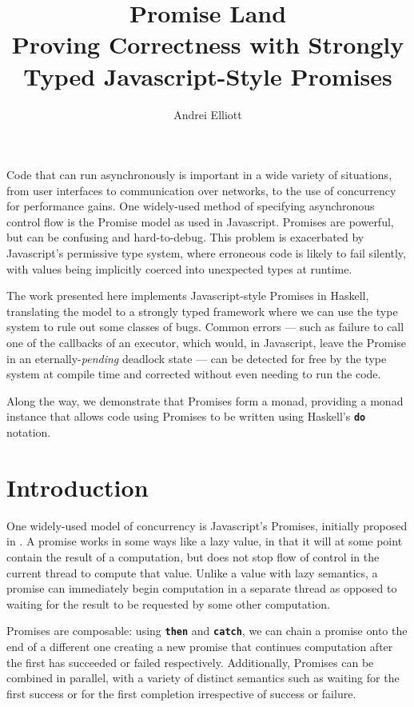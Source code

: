 \documentclass[12pt, english, letterpaper]{kuthesis}
\title{Promise Land\\
\smaller Proving Correctness with Strongly Typed Javascript-Style Promises}
\author{Andrei Elliott}
\newcommand{\lit}[1]{\textbf{\texttt{#1}}}
\begin{document}
\begin{romanpages}
  \maketitle
  \begin{abstractlong}
    Code that can run asynchronously is important in a wide variety of situations, from user interfaces to communication over networks, to the use of concurrency for performance gains.  One widely-used method of specifying asynchronous control flow is the \textsf{Promise} model as used in Javascript.  \textsf{Promises} are powerful, but can be confusing and hard-to-debug.  This problem is exacerbated by Javascript’s permissive type system, where erroneous code is likely to fail silently, with values being implicitly coerced into unexpected types at runtime.

The work presented here implements Javascript-style \textsf{Promises} in Haskell, translating the model to a strongly typed framework where we can use the type system to rule out some classes of bugs.  Common errors --- such as failure to call one of the callbacks of an executor, which would, in Javascript, leave the \textsf{Promise} in an eternally-\emph{pending} deadlock state --- can be detected for free by the type system at compile time and corrected without even needing to run the code.

Along the way, we demonstrate that \textsf{Promises} form a monad, providing a monad instance that allows code using \textsf{Promises} to be written using Haskell’s \lit{do} notation.
  \end{abstractlong}
\end{romanpages}

\chapter*{Introduction}
One widely-used model of concurrency is Javascript's \textsf{Promises}, initially proposed in \cite{friedman}.  A promise works in some ways like a lazy value, in that it will at some point contain the result of a computation, but does not stop flow of control in the current thread to compute that value.  Unlike a value with lazy semantics, a promise can immediately begin computation in a separate thread as opposed to waiting for the result to be requested by some other computation.

\textsf{Promises} are composable: using \lit{then} and \lit{catch}, we can chain a promise onto the end of a different one creating a new promise that continues computation after the first has succeeded or failed respectively.  Additionally, \textsf{Promises} can be combined in parallel, with a variety of distinct semantics such as waiting for the first success or for the first completion irrespective of success or failure.
\end{document}
